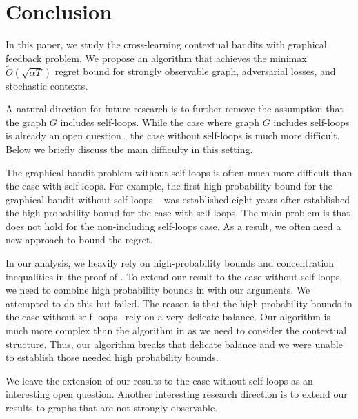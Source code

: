 \section{Conclusion}
In this paper, we study the cross-learning contextual bandits with graphical feedback problem.
%
We propose an algorithm that achieves the minimax $\widetilde{O}(\sqrt{\alpha T})$ regret bound for strongly observable graph, adversarial losses, and stochastic contexts.
%

A natural direction for future research is to further remove the assumption that the graph $G$ includes self-loops. While the case where graph $G$ includes self-loops is already an open question \citep{Han24,MAS24}, the case without self-loops is much more difficult. Below we briefly discuss the main difficulty in this setting.

The graphical bandit problem without self-loops is often much more difficult than the case with self-loops. For example, the first high probability bound for the graphical bandit without self-loops ~\citep{LuoGraph23} was established eight years after \citet{neu2015} established the high probability bound for the case with self-loops.
%
The main problem is that  does not hold for the non-including self-loops case. As a result, we often need a  new approach to bound the regret.
%

In our analysis, we heavily rely on high-probability bounds and concentration inequalities in the proof of . 
%
To extend our result to the case without self-loops, we need to combine high probability bounds in \citet{LuoGraph23} with our arguments.
%
We attempted to do this but failed. 
%
The reason is that the high probability bounds in the case without self-loops~\citep{LuoGraph23} rely on a very delicate balance.
%
Our algorithm is much more complex than the algorithm in \citet{LuoGraph23} as we need to consider the contextual structure. 
%
Thus, our algorithm breaks that delicate balance and we were unable to establish those needed high probability bounds.


We leave the extension of our results  to the case without self-loops as an interesting open question. Another interesting research direction is to extend our results to graphs that are not strongly observable. 

